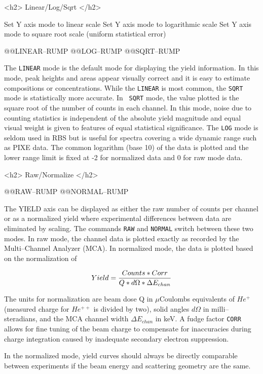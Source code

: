 {<h2> Linear/Log/Sqrt </h2>

 {Set Y axis mode to linear scale}
    {Set Y axis mode to logarithmic scale}
   {Set Y axis mode to square root scale (uniform statistical error)}

@@{LINEAR--RUMP} @@{LOG--RUMP} @@{SQRT--RUMP}

The {\tt LINEAR} mode is the default mode for displaying the yield
information.  In this mode, peak heights and areas appear visually correct and
it is easy to estimate compositions or concentrations.  While the {\tt LINEAR}
is most common, the {\tt SQRT} mode is statistically more accurate.  In {\tt
SQRT} mode, the value plotted is the square root of the number of counts in
each channel.  In this mode, noise due to counting statistics is independent
of the absolute yield magnitude and equal visual weight is given to features
of equal statistical significance.  The {\tt LOG} mode is seldom used in RBS
but is useful for spectra covering a wide dynamic range such as PIXE data.
The common logarithm (base 10) of the data is plotted and the lower range
limit is fixed at -2 for normalized data and 0 for raw mode data.


<h2> Raw/Normalize </h2>


@@{RAW--RUMP} @@{NORMAL--RUMP}

The YIELD axis can be displayed as either the raw number of counts per channel
or as a normalized yield where experimental differences between data are
eliminated by scaling.  The commands {\tt RAW} and {\tt NORMAL} switch between
these two modes.  In raw mode, the channel data is plotted exactly as recorded
by the Multi--Channel Analyzer (MCA).  In normalized mode, the data is plotted
based on the normalization of 

$$ Yield = {{Counts * Corr} \over {Q * d\Omega * \Delta E_{chan}}} $$

The units for normalization are beam dose Q in $\mu$Coulombs equivalents of
$He^{+}$ (measured charge for $He^{++}$ is divided by two), solid angles
$d\Omega$ in milli--steradians, and the MCA channel width $\Delta E_{chan}$ in
keV.  A fudge factor {\tt CORR} allows for fine tuning of the beam charge to
compensate for inaccuracies during charge integration caused by inadequate
secondary electron suppression.

In the normalized mode, yield curves should always be directly comparable
between experiments if the beam energy and scattering geometry are the same.

}
